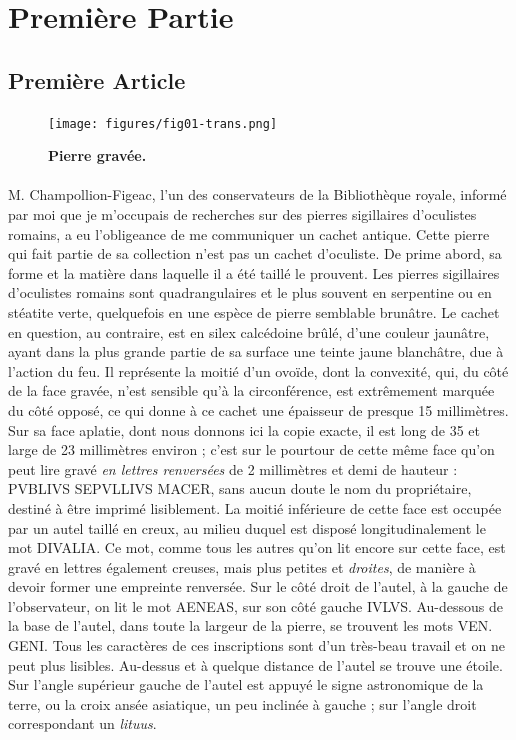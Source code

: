 \documentclass[a4paper, 11pt, oneside, polutonikogreek, french]{article}
\begin{document}
\section{Première Partie}
\subsection{Première Article}
\begin{figure}[H]
\centering
\texttt{[image: figures/fig01-trans.png]}
\caption{\bfseries Pierre gravée.}
\end{figure}
\paragraph{}
M. Champollion-Figeac, l'un des conservateurs de la Bibliothèque royale, informé par moi que je m'occupais de recherches sur des pierres sigillaires d'oculistes romains, a eu l'obligeance de me communiquer un cachet antique. Cette pierre qui fait partie de sa collection n'est pas un cachet d'oculiste. De prime abord, sa forme et la matière dans laquelle il a été taillé le prouvent. Les pierres sigillaires d'oculistes romains sont quadrangulaires et le plus souvent en serpentine ou en stéatite verte, quelquefois en une espèce de pierre semblable brunâtre. Le cachet en question, au contraire, est en silex calcédoine brûlé, d'une couleur jaunâtre, ayant dans la plus grande partie de sa surface une teinte jaune blanchâtre, due à l'action du feu. Il représente la moitié d'un ovoïde, dont la convexité, qui, du côté de la face gravée, n'est sensible qu'à la circonférence, est extrêmement marquée du côté opposé, ce qui donne à ce cachet une épaisseur de presque 15 millimètres. Sur sa face aplatie, dont nous donnons ici la copie exacte, il est long de 35 et large de 23 millimètres environ ; c'est sur le pourtour de cette même face qu'on peut lire gravé \emph{en lettres renversées} de 2 millimètres et demi de hauteur : PVBLIVS SEPVLLIVS MACER, sans aucun doute le nom du propriétaire, destiné à être imprimé lisiblement. La moitié inférieure de cette face est occupée par un autel taillé en creux, au milieu duquel est disposé longitudinalement le mot DIVALIA. Ce mot, comme tous les autres qu'on lit encore sur cette face, est gravé en lettres également creuses, mais plus petites et \emph{droites}, de manière à devoir former une empreinte renversée. Sur le côté droit de l'autel, à la gauche de l'observateur, on lit le mot AENEAS, sur son côté gauche IVLVS. Au-dessous de la base de l'autel, dans toute la largeur de la pierre, se trouvent les mots VEN. GENI. Tous les caractères de ces inscriptions sont d'un très-beau travail et on ne peut plus lisibles. Au-dessus et à quelque distance de l'autel se trouve une étoile. Sur l'angle supérieur gauche de l'autel est appuyé le signe astronomique de la terre, ou la croix ansée asiatique, un peu inclinée à gauche ; sur l'angle droit correspondant un \emph{lituus}.
\end{document}
